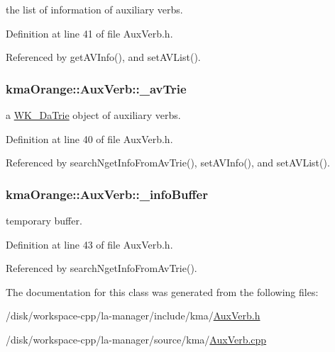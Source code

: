 the list of information of auxiliary verbs. 



Definition at line 41 of file AuxVerb.h.

Referenced by getAVInfo(), and setAVList().\hypertarget{classkmaOrange_1_1AuxVerb_44837d41f1db9576652a529cb29488b3}{
\subsubsection[{\_\-avTrie}]{ {\bf kmaOrange::AuxVerb::\_\-avTrie}}}
\label{classkmaOrange_1_1AuxVerb_44837d41f1db9576652a529cb29488b3}


a \hyperlink{classkmaOrange_1_1WK__DaTrie}{WK\_\-DaTrie} object of auxiliary verbs. 



Definition at line 40 of file AuxVerb.h.

Referenced by searchNgetInfoFromAvTrie(), setAVInfo(), and setAVList().\hypertarget{classkmaOrange_1_1AuxVerb_d2a513a5da13dd067e84c45386b0af98}{
\subsubsection[{\_\-infoBuffer}]{ {\bf kmaOrange::AuxVerb::\_\-infoBuffer}}}
\label{classkmaOrange_1_1AuxVerb_d2a513a5da13dd067e84c45386b0af98}


temporary buffer. 



Definition at line 43 of file AuxVerb.h.

Referenced by searchNgetInfoFromAvTrie().

The documentation for this class was generated from the following files:\begin{CompactItemize}
\item 
/disk/workspace-cpp/la-manager/include/kma/\hyperlink{AuxVerb_8h}{AuxVerb.h}\item 
/disk/workspace-cpp/la-manager/source/kma/\hyperlink{AuxVerb_8cpp}{AuxVerb.cpp}\end{CompactItemize}
